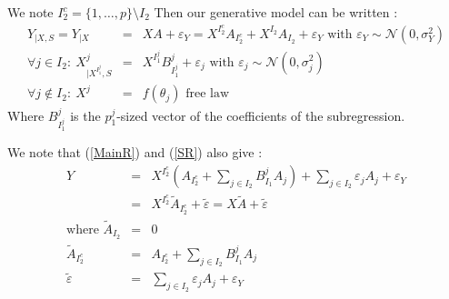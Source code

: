 \documentclass[11pt,a4paper]{article}
\begin{document}
	We note $I_2^c=\{1,\dots,p\}\setminus I_2$
Then our generative model can be written :
\begin{eqnarray}
	Y_{|X,S}=Y_{|X}&=&XA+\varepsilon_Y= X^{I_2^c}A_{I_2^c}+X^{I_2}A_{I_2}+\varepsilon_Y \textrm{ with } \varepsilon_Y \sim \mathcal{N}(0,\sigma_Y^2) \label{MainR}\\
	\forall j \in I_2 : \  X^j_{|X^{I_1^j},S}&=&X^{I_1^j}B_{I_1^j}^j + \varepsilon_{j} \textrm{ with } \varepsilon_j \sim \mathcal{N}(0,\sigma_j^2) \label{SR}\\
    \forall j \notin I_2 : \ X^j &=& f(\theta_j) \textrm{ free law}	
\end{eqnarray}
Where $B_{I_1^j}^j$ is the $p_1^j$-sized vector of the coefficients of the subregression.

We note that (\ref{MainR}) and (\ref{SR}) also give :
\begin{eqnarray}
	Y&=&X^{I_2^c} (A_{I_2^c}+ \sum_{j \in I_2}B^{j}_{I_1}A_{j})+  \sum_{j \in I_2}\varepsilon_{j}A_{j}+\varepsilon_Y \\
					&=& X^{I_2^c}\tilde{A}_{I_2^c}+ \tilde{\varepsilon}=X\tilde{A}+ \tilde{\varepsilon}\label{Trueexpl} \\
			\textrm{where }		\tilde{A}_{I_2}&=&0 \\
					\tilde{A}_{I_2^c}&=&A_{I_2^c}+ \sum_{j \in I_2}B^{j}_{I_1}A_{j} \\
					\tilde{\varepsilon}&=&\sum_{j \in I_2}\varepsilon_{j}A_{j}+\varepsilon_Y 
\end{eqnarray}
\end{document}
